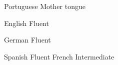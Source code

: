 \vspace{-20}



\begin{cvskills}

\cvskill
{Portuguese} %
{Mother tongue} %


\cvskill
{English} %
{Fluent} %


\cvskill
{German}
{Fluent}

\cvskill
{Spanish}
{Fluent}
\vspace{0.5cm}
\cvskill
{French} %
{Intermediate} %
\vspace{0.4cm}


\end{cvskills}